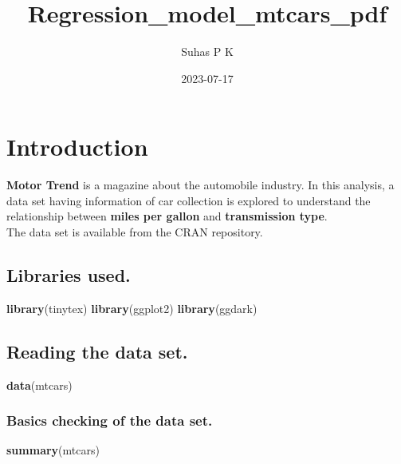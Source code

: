 \documentclass[
]{article}
\title{Regression\_model\_mtcars\_pdf}
\author{Suhas P K}
\date{2023-07-17}
\newenvironment{Shaded}{\begin{snugshade}}{\end{snugshade}}
\newcommand{\FunctionTok}[1]{\textcolor[rgb]{0.13,0.29,0.53}{\textbf{#1}}}
\newcommand{\NormalTok}[1]{#1}
\begin{document}
\maketitle

\hypertarget{introduction}{%
\section{Introduction}\label{introduction}}

\textbf{Motor Trend} is a magazine about the automobile industry. In
this analysis, a data set having information of car collection is
explored to understand the relationship between \textbf{miles per
gallon} and \textbf{transmission type}.\\
The data set is available from the CRAN repository.\\

\hypertarget{libraries-used.}{%
\subsection{Libraries used.}\label{libraries-used.}}

\begin{Shaded}
\begin{Highlighting}[]
\FunctionTok{library}\NormalTok{(tinytex)}
\FunctionTok{library}\NormalTok{(ggplot2)}
\FunctionTok{library}\NormalTok{(ggdark)}
\end{Highlighting}
\end{Shaded}

\hypertarget{reading-the-data-set.}{%
\subsection{Reading the data set.}\label{reading-the-data-set.}}

\begin{Shaded}
\begin{Highlighting}[]
\FunctionTok{data}\NormalTok{(mtcars)}
\end{Highlighting}
\end{Shaded}

\hypertarget{basics-checking-of-the-data-set.}{%
\subsubsection{Basics checking of the data
set.}\label{basics-checking-of-the-data-set.}}

\begin{Shaded}
\begin{Highlighting}[]
\FunctionTok{summary}\NormalTok{(mtcars)}
\end{Highlighting}
\end{Shaded}
\end{document}
